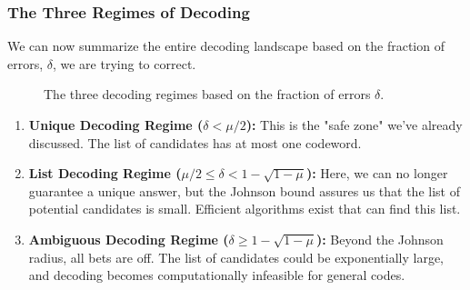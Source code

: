 \documentclass{article}
\begin{document}
\subsubsection{The Three Regimes of Decoding}
We can now summarize the entire decoding landscape based on the fraction of errors, $\delta$, we are trying to correct.

\begin{figure}[h!]
\centering
{}
\caption{The three decoding regimes based on the fraction of errors $\delta$.}
\label{fig:decoding_regimes}
\end{figure}


\begin{enumerate}
    \item \textbf{Unique Decoding Regime ($\delta < \mu/2$):} This is the "safe zone" we've already discussed. The list of candidates has at most one codeword.
    \item \textbf{List Decoding Regime ($\mu/2 \leq \delta < 1-\sqrt{1-\mu}$):} Here, we can no longer guarantee a unique answer, but the Johnson bound assures us that the list of potential candidates is small. Efficient algorithms exist that can find this list.
    \item \textbf{Ambiguous Decoding Regime ($\delta \geq 1-\sqrt{1-\mu}$):} Beyond the Johnson radius, all bets are off. The list of candidates could be exponentially large, and decoding becomes computationally infeasible for general codes.
\end{enumerate}
\end{document}
